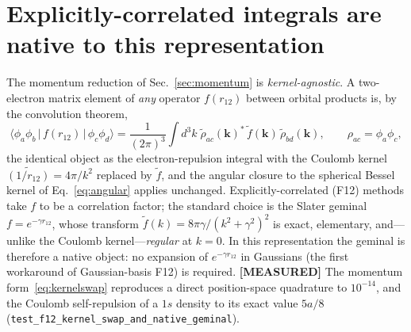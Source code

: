 \documentclass[aps,pra,twocolumn,superscriptaddress,longbibliography]{revtex4-2}
\begin{document}
\section{Explicitly-correlated integrals are native to this representation}
\label{sec:f12}

The momentum reduction of Sec.~\ref{sec:momentum} is \emph{kernel-agnostic}.  A
two-electron matrix element of \emph{any} operator $f(r_{12})$ between orbital products
is, by the convolution theorem,
%
\begin{equation}
\langle \phi_a\phi_b\,|\,f(r_{12})\,|\,\phi_c\phi_d\rangle
=\frac{1}{(2\pi)^3}\!\int\! d^3k\;
\widetilde{\rho}_{ac}(\bm k)^{*}\,\widetilde f(\bm k)\,\widetilde{\rho}_{bd}(\bm k),
\qquad \rho_{ac}=\phi_a\phi_c,
\label{eq:kernelswap}
\end{equation}
%
the identical object as the electron-repulsion integral with the Coulomb kernel
$\widetilde{(1/r_{12})}=4\pi/k^{2}$ replaced by $\widetilde f$, and the angular closure to
the spherical Bessel kernel of Eq.~\eqref{eq:angular} applies unchanged.
Explicitly-correlated (F12) methods take $f$ to be a correlation factor; the standard
choice is the Slater geminal $f=e^{-\gamma r_{12}}$, whose transform
$\widetilde f(k)=8\pi\gamma/(k^{2}+\gamma^{2})^{2}$ is exact, elementary, and---unlike the
Coulomb kernel---\emph{regular} at $k=0$.  In this representation the geminal is therefore
a native object: no expansion of $e^{-\gamma r_{12}}$ in Gaussians (the first workaround of
Gaussian-basis F12) is required.  \textbf{[MEASURED]} The momentum
form~\eqref{eq:kernelswap} reproduces a direct position-space quadrature to $10^{-14}$, and
the Coulomb self-repulsion of a $1s$ density to its exact value $5a/8$
(\texttt{test\_f12\_kernel\_swap\_and\_native\_geminal}).
\end{document}
